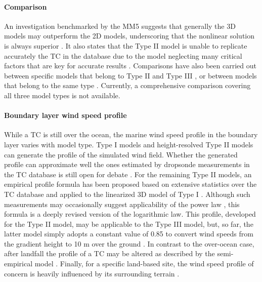 \paragraph{Comparison} An investigation benchmarked by the MM5 \citep{liu1997multiscale} suggests that generally the 3D models may outperform the 2D models, underscoring that the nonlinear solution is always superior \citep{kepert2010slab-i,kepert2010slab-ii, kepert2014reply}. It also states that the Type II model is unable to replicate accurately the TC in the database due to the model neglecting many critical factors that are key for accurate results \citep{kepert2010slab-i}. Comparisons have also been carried out between specific models that belong to Type II and Type III \citep{smith2008critique}, or between models that belong to the same type \citep{snaiki2017linear, wills2000review}. Currently, a comprehensive comparison covering all three model types is not available. 

\paragraph{Boundary layer wind speed profile} While a TC is still over the ocean, the marine wind speed profile in the boundary layer varies with model type. Type I models and height-resolved Type II models can generate the profile of the simulated wind field. Whether the generated profile can approximate well the ones estimated by dropsonde measurements in the TC database is still open for debate \citep{kepert2001dynamics-ii, kepert2011choosing, kepert2013how, montgomery2014comments, smith1968surface}. For the remaining Type II models, an empirical profile formula has been proposed based on extensive statistics over the TC database and applied to the linearized 3D model of Type I \citep{vickery2009hurricane-b}. Although such measurements may occasionally suggest applicability of the power law \citep{song2016characteristics}, this formula is a deeply revised version of the logarithmic law. This profile, developed for the Type II model, may be applicable to the Type III model, but, so far, the latter model simply adopts a constant value of 0.85 to convert wind speeds from the gradient height to 10 m over the ground \citep{chavas2015model}. In contrast to the over-ocean case, after landfall the profile of a TC may be altered as described by the semi-empirical model \citep{snaiki2018semiempirical}. Finally, for a specific land-based site, the wind speed profile of concern is heavily influenced by its surrounding terrain \citep{huang2013prediction}.


